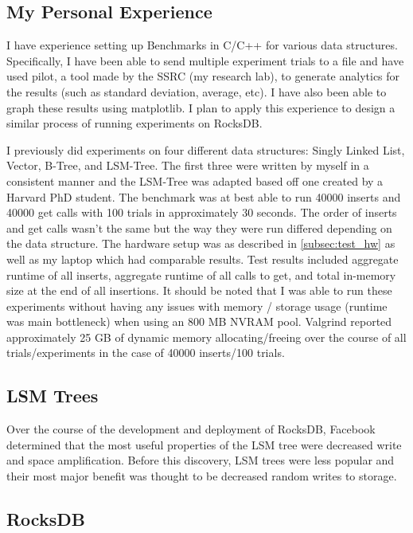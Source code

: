 \documentclass{article}
\begin{document}
\subsection{My Personal Experience}
\label{subsec:personal_experience}

I have experience setting up Benchmarks in C/C++ for various data structures.
Specifically, I have been able to send multiple experiment trials to a file and
have used pilot, a tool made by the SSRC (my research lab), to generate
analytics for the results (such as standard deviation, average, etc). I have
also been able to graph these results using matplotlib. I plan to apply this
experience to design a similar process of running experiments on RocksDB.

I previously did experiments on four different data structures: Singly Linked
List, Vector, B-Tree, and LSM-Tree. The first three were written by myself in a
consistent manner and the LSM-Tree was adapted based off one created by a
Harvard PhD student. The benchmark was at best able to run 40000 inserts and
40000 get calls with 100 trials in approximately 30 seconds. The order of
inserts and get calls wasn't the same but the way they were run differed
depending on the data structure. The hardware setup was as described in
\ref{subsec:test_hw} as well as my laptop which had comparable results. Test
results included aggregate runtime of all inserts, aggregate runtime of all
calls to get, and total in-memory size at the end of all insertions. It should
be noted that I was able to run these experiments without having any issues with
memory / storage usage (runtime was main bottleneck) when using an 800 MB NVRAM
pool. Valgrind reported approximately 25 GB of dynamic memory allocating/freeing
over the course of all trials/experiments in the case of 40000 inserts/100
trials.

\subsection{LSM Trees}


Over the course of the development and deployment of RocksDB, Facebook
determined that the most useful properties of the LSM tree were decreased write
and space amplification. Before this discovery, LSM trees were less popular and
their most major benefit was thought to be decreased random writes to storage.

\subsection{RocksDB}
\end{document}

